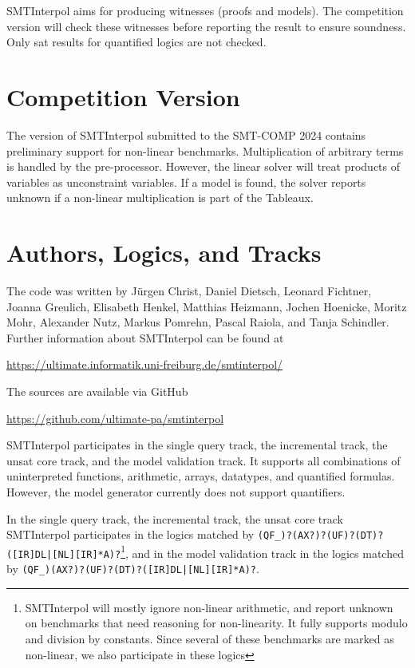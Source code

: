 \documentclass[a4paper]{easychair}
\newcommand\SI{SMTInterpol\xspace}
\begin{document}
\SI aims for producing witnesses (proofs and models).  The competition version will check these witnesses before reporting the result to ensure soundness.  Only sat results for quantified logics are not checked.


\section*{Competition Version}
The version of \SI submitted to the SMT-COMP 2024 contains
preliminary support for non-linear benchmarks.  Multiplication of arbitrary terms is handled by the pre-processor.  However, the linear solver will treat products of variables as unconstraint variables.  If a model is found, the solver reports unknown if a non-linear multiplication is part of the Tableaux.

\section*{Authors, Logics, and Tracks}
The code was written by J{\"u}rgen Christ, Daniel Dietsch, Leonard Fichtner, Joanna Greulich, Elisabeth Henkel, Matthias Heizmann, Jochen Hoenicke, Moritz Mohr, Alexander Nutz, Markus Pomrehn, Pascal Raiola, and Tanja Schindler.
Further information about \SI can be found at
\begin{center}
  \url{https://ultimate.informatik.uni-freiburg.de/smtinterpol/}
\end{center}
The sources are available via GitHub
\begin{center}
  \url{https://github.com/ultimate-pa/smtinterpol}
\end{center}

\SI participates in the single query track, the incremental track, the unsat core track, and the model validation track.
It supports all combinations of uninterpreted functions, arithmetic, arrays, datatypes, and quantified formulas.
However, the model generator currently does not support quantifiers.

In the single query track, the incremental track, the unsat core track \SI participates in the logics matched by
\verb!(QF_)?(AX?)?(UF)?(DT)?([IR]DL|[NL][IR]*A)?!\footnote{\SI will mostly ignore non-linear arithmetic, and report unknown on benchmarks that need reasoning for non-linearity.  It fully supports modulo and division by constants.  Since several of these benchmarks are marked as non-linear, we also participate in these logics},
and in the model validation track in the logics matched by
\verb!(QF_)(AX?)?(UF)?(DT)?([IR]DL|[NL][IR]*A)?!.



\end{document}
